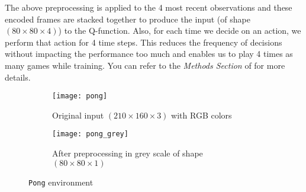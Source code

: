 \documentclass{article}
\begin{document}
The above preprocessing is applied to the 4 most recent observations and these encoded frames are stacked together to produce the input (of shape $(80 \times 80 \times 4)$) to the Q-function. Also, for each time we decide on an action, we perform that action for 4 time steps. This reduces the frequency of decisions without impacting the performance too much and enables us to play 4 times as many games while training. You can refer to the \textit{Methods Section} of \cite{mnih2015human} for more details.       \\  

\begin{figure}[H]
\centering
\begin{subfigure}[b]{.5\textwidth}
  \centering
  \texttt{[image: pong]}
  \caption{Original input $ (210 \times 160 \times 3) $ with RGB colors}
  \label{fig:pong}
\end{subfigure}
\begin{subfigure}[b]{.5\textwidth}
  \centering
  \texttt{[image: pong\_grey]}
  \caption{After preprocessing in grey scale of shape $ (80 \times 80 \times 1 ) $}
  \label{fig:pong_grey}
\end{subfigure}
\caption{\texttt{Pong} environment}
\label{fig:pong_env}
\end{figure}
\end{document}
